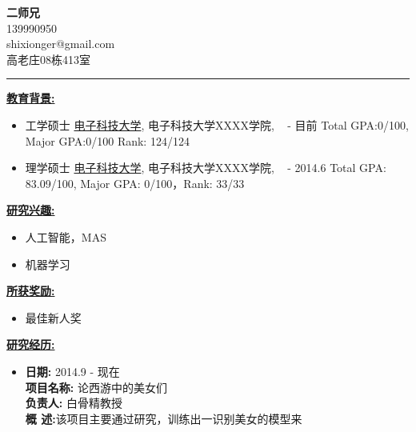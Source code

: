\documentclass[12pt]{article}
\begin{document}
\begin{CJK}{GBK}{kai}
\begin{center}

{\large \textbf{二师兄}}\\
  139990950\\
  shixionger@gmail.com \\
  高老庄08栋413室
  \end{center}
  \rule[4pt]{18cm}{0.5pt}
  \smallskip
  {\large \textbf{\underline{教育背景:}}}\\
  \begin{itemize}
 \item 工学硕士 \qquad \underline{电子科技大学}, 电子科技大学XXXX学院, \  - 目前
   \smallskip
             \newline \hphantom{工学硕士 \qquad } {\small Total GPA:0/100, \quad Major GPA:0/100 } \quad Rank: 124/124\\
 \bigskip

\item 理学硕士 \qquad \underline{电子科技大学}, 电子科技大学XXXX学院, \ \quad {} - 2014.6
        \smallskip
        \newline \hphantom{理学硕士 \qquad} {\small Total GPA: 83.09/100, \quad Major GPA: 0/100，\quad Rank: 33/33 }
\end{itemize}

\bigskip
{\large \textbf{\underline{研究兴趣:}}}\\
\begin{itemize}
\item 人工智能，MAS
\item 机器学习
\end{itemize}
\bigskip
{\large \textbf{\underline{所获奖励:}}}\\
\medskip
\begin{itemize}
\item  最佳新人奖 
\end{itemize}

\bigskip
{\large \textbf{\underline{研究经历:}}}\\
\medskip
\begin{itemize}
\item \textbf{日期:} 2014.9 - 现在\\
\smallskip
\textbf{项目名称:} 论西游中的美女们\\
\smallskip
\textbf{负责人:} 白骨精教授\\
\smallskip
\textbf{概 述:}该项目主要通过研究，训练出一识别美女的模型来
\end{itemize}


\end{CJK}
\end{document}
